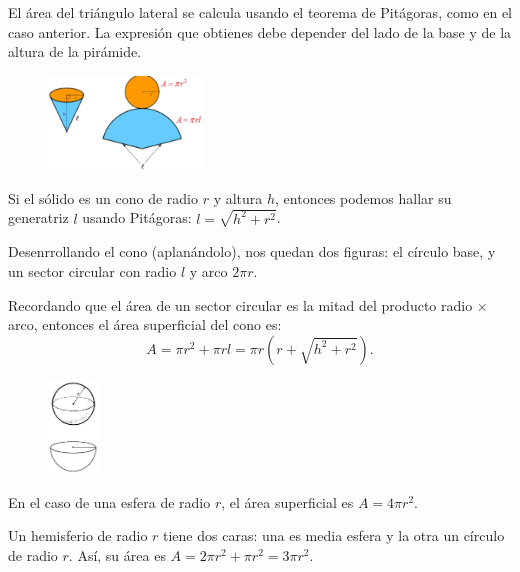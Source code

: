 \documentclass[12pt,a4paper]{article}
\begin{document}
\begin{tcolorbox}[colback=fondorosa, colframe=rojoclaro, title=\textbf{Mini-explicación: Área superficial: ¿cuánto se necesita para cubrir la superficie de un sólido?}, breakable]
El área del triángulo lateral se calcula usando el teorema de Pitágoras, como en el caso anterior. La expresión que obtienes debe depender del lado de la base y de la altura de la pirámide.

\begin{figure}
\centering
\vspace{-10pt}
\includegraphics[height=2.5cm]{Figuras/fig72.png}
\vspace{-10pt}
\end{figure}

Si el sólido es un cono de radio $r$ y altura $h$, entonces podemos hallar su generatriz $l$ usando Pitágoras: $l = \sqrt{h^2 + r^2}$.

Desenrrollando el cono (aplanándolo), nos quedan dos figuras: el círculo base, y un sector circular con radio $l$ y arco $2\pi r$.

Recordando que el área de un sector circular es la mitad del producto radio $\times$ arco, entonces el área superficial del cono es:
$$A = \pi r^2 + \pi rl = \pi r(r + \sqrt{h^2 + r^2}).$$

\begin{figure}
\centering
\vspace{-40pt}
\includegraphics[height=2.5cm]{Figuras/fig73.png}
\vspace{-10pt}
\end{figure}

En el caso de una esfera de radio $r$, el área superficial es $A = 4\pi r^2$.

Un hemisferio de radio $r$ tiene dos caras: una es media esfera y la otra un círculo de radio $r$. Así, su área es $A = 2\pi r^2 + \pi r^2 = 3\pi r^2$.
\end{tcolorbox}

\vspace{4mm}

\end{document}
